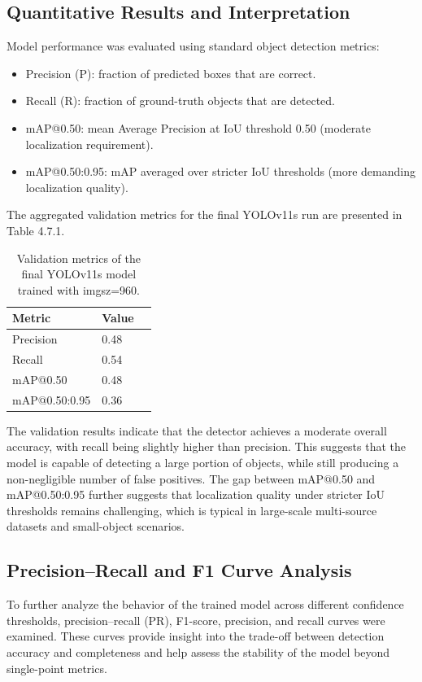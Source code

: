 \documentclass[12pt,a4paper]{report}
\begin{document}
\subsection{Quantitative Results and Interpretation}
Model performance was evaluated using standard object detection metrics\cite{everingham2010pascal}:

\begin{itemize}
    \item Precision (P): fraction of predicted boxes that are correct.
    \item Recall (R): fraction of ground-truth objects that are detected.
    \item mAP@0.50: mean Average Precision at IoU threshold 0.50 (moderate localization requirement).
    \item mAP@0.50:0.95: mAP averaged over stricter IoU thresholds (more demanding localization quality).
\end{itemize}
The aggregated validation metrics for the final YOLOv11s run are presented in Table 4.7.1.

\begin{table}[H]
\centering
\caption[Validation metrics]{Validation metrics of the final YOLOv11s model trained with imgsz=960.}
\label{tab:values}
\begin{tabular}{lll}
\hline
\textbf{Metric} & \textbf{Value} \\
\hline
Precision & 0.48 \\
Recall & 0.54 \\
mAP@0.50 & 0.48 \\
mAP@0.50:0.95 & 0.36 \\
\hline
\end{tabular}
\end{table}
The validation results  indicate that the detector achieves a moderate overall accuracy, with recall being slightly higher than precision. This suggests that the model is capable of detecting a large portion of objects, while still producing a non-negligible number of false positives. The gap between mAP@0.50 and mAP@0.50:0.95 further suggests that localization quality under stricter IoU thresholds remains challenging, which is typical in large-scale multi-source datasets and small-object scenarios. 

\subsection{Precision–Recall and F1 Curve Analysis}
To further analyze the behavior of the trained model across different confidence thresholds, precision–recall (PR), F1-score, precision, and recall curves were examined. These curves provide insight into the trade-off between detection accuracy and completeness and help assess the stability of the model beyond single-point metrics.
\end{document}
